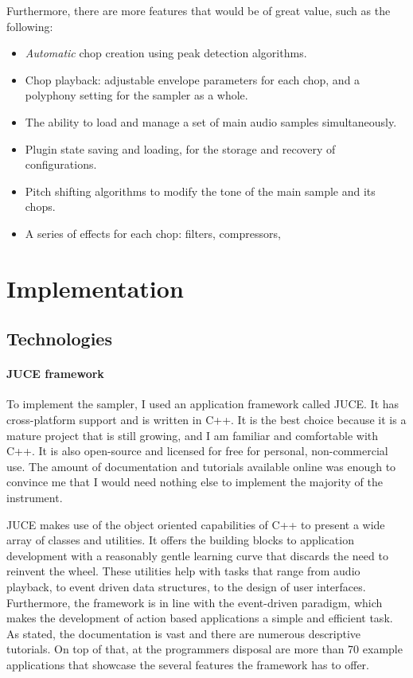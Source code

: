 \documentclass[12pt, a4paper, hidelinks]{article}
\begin{document}
	Furthermore, there are more features that would be of great value, such as the following:
	\begin{itemize}
		\item \textit{Automatic} chop creation using peak detection algorithms.
		\item Chop playback: adjustable envelope parameters for each chop, and a polyphony setting for the sampler as a whole.
		\item The ability to load and manage a set of main audio samples simultaneously.
		\item Plugin state saving and loading, for the storage and recovery of configurations.
		\item Pitch shifting algorithms to modify the tone of the main sample and its chops.
		\item A series of effects for each chop: filters, compressors, 
	\end{itemize}

	
	\newpage
	\section{Implementation}
	\subsection{Technologies}	
	\paragraph{JUCE framework\\}
	To implement the sampler, I used an application framework called JUCE\cite{juceweb}. It has cross-platform support and is written in C++. It is the best choice because  it is a mature project that is still growing, and I am familiar and comfortable with C++. It is also open-source and licensed for free for personal, non-commercial use. The amount of documentation and tutorials available online was enough to convince me that I would need nothing else to implement the majority of the instrument.
	
	JUCE makes use of the object oriented capabilities of C++ to present a wide array of classes and utilities. It offers the building blocks to application development with a reasonably gentle learning curve that discards the need to reinvent the wheel. These utilities help with tasks that range from audio playback, to event driven data structures, to the design of user interfaces. Furthermore, the framework is in line with the event-driven paradigm, which makes the development of action based applications a simple and efficient task. As stated, the documentation is vast and there are numerous descriptive tutorials. On top of that, at the programmers disposal are more than 70 example applications that showcase the several features the framework has to offer. 
	
\end{document}
